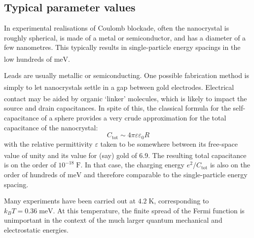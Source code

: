 \documentclass[a4paper,11pt]{article}
\let\oldcite\cite
\renewcommand{\cite}[1]{\textsuperscript{\oldcite{#1}}}
\begin{document}
    \subsection{Typical parameter values}

    In experimental realisations of Coulomb blockade, often the nanocrystal is roughly spherical, is made of a metal or semiconductor, and has a diameter of a few nanometres. This typically results in single-particle energy spacings in the low hundreds of $\mathrm{meV}$\cite{Bakkers-2001}.

    Leads are usually metallic or semiconducting. One possible fabrication method is simply to let nanocrystals settle in a gap between gold electrodes\cite{Sun-2005}. Electrical contact may be aided by organic `linker' molecules\cite{Klein-1997}, which is likely to impact the source and drain capacitances. In spite of this, the classical formula for the self-capacitance of a sphere provides a very crude approximation for the total capacitance of the nanocrystal:
    \begin{equation}
        C_\mathrm{tot} \sim 4\pi\varepsilon\varepsilon_0 R
    \end{equation}
    with the relative permittivity $\varepsilon$ taken to be somewhere between its free-space value of unity and its value for (say) gold\cite{Shklyarevskii-1973} of 6.9. The resulting total capacitance is on the order of $10^{-18}\;\mathrm{F}$. In that case, the charging energy $e^2/C_\mathrm{tot}$ is also on the order of hundreds of $\mathrm{meV}$ and therefore comparable to the single-particle energy spacing.

    Many experiments have been carried out at $4.2\;\mathrm{K}$, corresponding to $k_B T = 0.36\;\mathrm{meV}$. At this temperature, the finite spread of the Fermi function is unimportant in the context of the much larger quantum mechanical and electrostatic energies.
\end{document}
